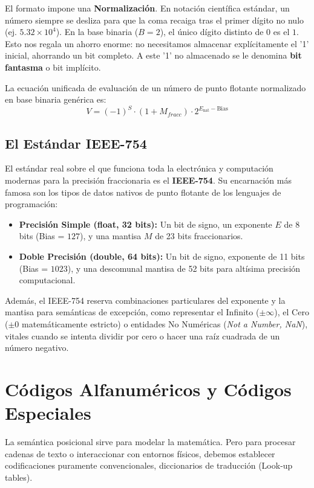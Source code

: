 El formato impone una \textbf{Normalización}. En notación científica estándar, un número siempre se desliza para que la coma recaiga tras el primer dígito no nulo (ej. $5.32 \times 10^4$). En la base binaria ($B=2$), el único dígito distinto de $0$ es el $1.$ Esto nos regala un ahorro enorme: no necesitamos almacenar explícitamente el '1' inicial, ahorrando un bit completo. A este '1' no almacenado se le denomina \textbf{bit fantasma} o bit implícito.

La ecuación unificada de evaluación de un número de punto flotante normalizado en base binaria genérica es:
\[ V = (-1)^S \cdot (1 + M_{fracc}) \cdot 2^{E_{\text{nat}} - \text{Bias}} \]

\subsection{El Estándar IEEE-754}
El estándar real sobre el que funciona toda la electrónica y computación modernas para la precisión fraccionaria es el \textbf{IEEE-754}. Su encarnación más famosa son los tipos de datos nativos de punto flotante de los lenguajes de programación:

\begin{itemize}
    \item \textbf{Precisión Simple (float, 32 bits):} Un bit de signo, un exponente $E$ de 8 bits (Bias = $127$), y una mantisa $M$ de 23 bits fraccionarios.
    \item \textbf{Doble Precisión (double, 64 bits):} Un bit de signo, exponente de 11 bits (Bias = $1023$), y una descomunal mantisa de 52 bits para altísima precisión computacional.
\end{itemize}
Además, el IEEE-754 reserva combinaciones particulares del exponente y la mantisa para semánticas de excepción, como representar el Infinito ($\pm \infty$), el Cero ($\pm 0$ matemáticamente estricto) o entidades No Numéricas (\textit{Not a Number, NaN}), vitales cuando se intenta dividir por cero o hacer una raíz cuadrada de un número negativo.

\section{Códigos Alfanuméricos y Códigos Especiales}

La semántica posicional sirve para modelar la matemática. Pero para procesar cadenas de texto o interaccionar con entornos físicos, debemos establecer codificaciones puramente convencionales, diccionarios de traducción (Look-up tables).

